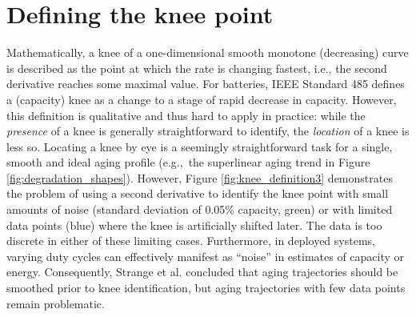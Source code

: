 \documentclass[journal=jpclcd,manuscript=article]{achemso}
\newcommand{\cmark}{\textcolor{blue}{\textrm{\ding{52}}}}%
\newcommand{\pbox}[1]{{
\fbox{
\parbox{0.8\textwidth}{  \fbox{$\triangleright$\textcolor{blue}{\textbf{Peter}:}} 
#1
}}}}
\begin{document}
\section{Defining the knee point}


Mathematically, a knee of a one-dimensional smooth monotone (decreasing) curve is described as the point at which the rate is changing fastest, i.e., the second derivative reaches some maximal value. For batteries, IEEE Standard 485 defines a (capacity) knee as a change to a stage of rapid decrease in capacity\cite{noauthor_ieee_2011}. However, this definition is qualitative and thus hard to apply in practice: while the \textit{presence} of a knee is generally straightforward to identify, the \textit{location} of a knee is less so. 
Locating a knee by eye is a seemingly straightforward task for a single, smooth and ideal aging profile (e.g.,~the superlinear aging trend in Figure \ref{fig:degradation_shapes}). However, Figure \ref{fig:knee_definition3} demonstrates the problem of using a second derivative to identify the knee point with small amounts of noise (standard deviation of 0.05\% capacity, green) or with limited data points (blue) where the knee is artificially shifted later. The data is too discrete in either of these limiting cases. Furthermore, in deployed systems, varying duty cycles can effectively manifest as ``noise'' in estimates of capacity or energy.
Consequently, Strange et al.\cite{strange_elbows_2021} concluded that aging trajectories should be smoothed prior to knee identification, but aging trajectories with few data points remain problematic.
\end{document}
